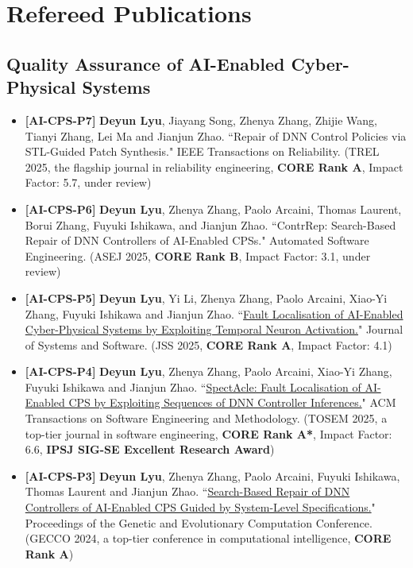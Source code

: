 \documentclass[11pt,a4paper]{moderncv}        %
\newcommand{\highlight}[1]{\textcolor{deepPurple}{\textbf{#1}}}
\begin{document}
\section{Refereed Publications}

\subsection{Quality Assurance of AI-Enabled Cyber-Physical Systems}

\begin{itemize}
    \item \hypertarget{pub:AI-CPS-P7}{}\textbf{[AI-CPS-P7]} \textbf{Deyun Lyu}, Jiayang Song, Zhenya Zhang, Zhijie Wang, Tianyi Zhang, Lei Ma and Jianjun Zhao. ``Repair of DNN Control Policies via STL-Guided Patch Synthesis." IEEE Transactions on Reliability. (TREL 2025, the flagship journal in reliability engineering, \highlight{CORE Rank A}, Impact Factor: 5.7, under review)
    \item \hypertarget{pub:AI-CPS-P6}{}\textbf{[AI-CPS-P6]} \textbf{Deyun Lyu}, Zhenya Zhang, Paolo Arcaini, Thomas Laurent, Borui Zhang, Fuyuki Ishikawa, and Jianjun Zhao. ``ContrRep: Search-Based Repair of DNN Controllers of AI-Enabled CPSs." Automated Software Engineering. (ASEJ 2025, \highlight{CORE Rank B}, Impact Factor: 3.1, under review)
    \item \hypertarget{pub:AI-CPS-P5}{}\textbf{[AI-CPS-P5]} \textbf{Deyun Lyu}, Yi Li, Zhenya Zhang, Paolo Arcaini, Xiao-Yi Zhang, Fuyuki Ishikawa and Jianjun Zhao. ``\href{https://www.sciencedirect.com/science/article/abs/pii/S0164121225001438}{Fault Localisation of AI-Enabled Cyber-Physical Systems by Exploiting Temporal Neuron Activation.}" Journal of Systems and Software. (JSS 2025, \highlight{CORE Rank A}, Impact Factor: 4.1) 
    \item \hypertarget{pub:AI-CPS-P4}{}\textbf{[AI-CPS-P4]} \textbf{Deyun Lyu}, Zhenya Zhang, Paolo Arcaini, Xiao-Yi Zhang, Fuyuki Ishikawa and Jianjun Zhao. ``\href{https://dl.acm.org/doi/10.1145/3705307}{SpectAcle: Fault Localisation of AI-Enabled CPS by Exploiting Sequences of DNN Controller Inferences.}" ACM Transactions on Software Engineering and Methodology. (TOSEM 2025, a top-tier journal in software engineering, \highlight{CORE Rank A*}, Impact Factor: 6.6, \highlight{IPSJ SIG-SE Excellent Research Award})
    \item \hypertarget{pub:AI-CPS-P3}{}\textbf{[AI-CPS-P3]} \textbf{Deyun Lyu}, Zhenya Zhang, Paolo Arcaini, Fuyuki Ishikawa, Thomas Laurent and Jianjun Zhao. ``\href{https://dl.acm.org/doi/10.1145/3638529.3654078}{Search-Based Repair of DNN Controllers of AI-Enabled CPS Guided by System-Level Specifications.}"  Proceedings of the Genetic and Evolutionary Computation Conference. (GECCO 2024, a top-tier conference in computational intelligence, \highlight{CORE Rank A})

\end{itemize}
\end{document}
